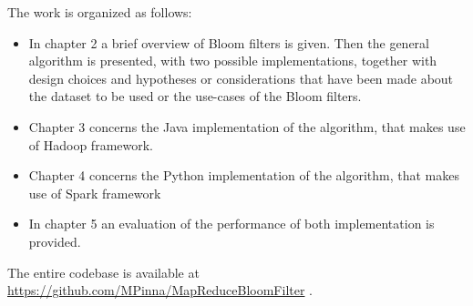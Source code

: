 The work is organized as follows:
\begin{itemize}
	\item In chapter 2 a brief overview of Bloom filters is given. Then the general algorithm is presented, with two possible implementations, together with design choices and hypotheses or considerations that have been made about the dataset to be used or the use-cases of the Bloom filters.
	\item Chapter 3 concerns the Java implementation of the algorithm, that makes use of Hadoop framework.
	\item Chapter 4 concerns the Python implementation of the algorithm, that makes use of Spark framework
	\item In chapter 5 an evaluation of the performance of both implementation is provided.
\end{itemize}

The entire codebase is available at \url{https://github.com/MPinna/MapReduceBloomFilter} .